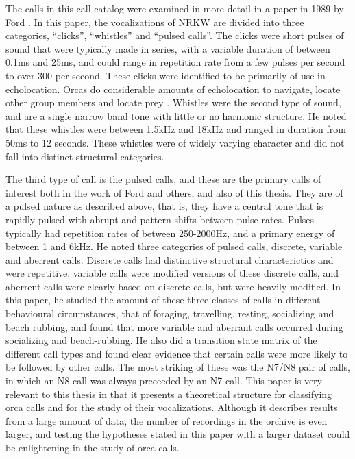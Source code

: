 \documentclass[12pt,oneside]{book}
\begin{document}
The calls in this call catalog were examined in more detail in a paper
in 1989 by Ford \cite{ford89}.  In this paper, the vocalizations of
NRKW are divided into three categories, ``clicks'', ``whistles'' and
``pulsed calls''.  The clicks were short pulses of sound that were
typically made in series, with a variable duration of between 0.1ms
and 25ms, and could range in repetition rate from a few pulses per
second to over 300 per second.  These clicks were identified to be
primarily of use in echolocation.  Orcas do considerable amounts of
echolocation to navigate, locate other group members and locate prey
\cite{barretlennard96}.  Whistles were the second type of sound, and
are a single narrow band tone with little or no harmonic structure.
He noted that these whistles were between 1.5kHz and 18kHz and ranged
in duration from 50ms to 12 seconds.  These whistles were of widely
varying character and did not fall into distinct structural
categories.

The third type of call is the pulsed calls, and these are the primary
calls of interest both in the work of Ford and others, and also of
this thesis.  They are of a pulsed nature as described above, that is,
they have a central tone that is rapidly pulsed with abrupt and
pattern shifts between pulse rates.  Pulses typically had repetition
rates of between 250-2000Hz, and a primary energy of between 1 and
6kHz.  He noted three categories of pulsed calls, discrete, variable
and aberrent calls.  Discrete calls had distinctive structural
characterictics and were repetitive, variable calls were modified
versions of these discrete calls, and aberrent calls were clearly
based on discrete calls, but were heavily modified.  In this paper, he
studied the amount of these three classes of calls in different
behavioural circumstances, that of foraging, travelling, resting,
socializing and beach rubbing, and found that more variable and
aberrant calls occurred during socializing and beach-rubbing.  He also
did a transition state matrix of the different call types and found
clear evidence that certain calls were more likely to be followed by
other calls.  The most striking of these was the N7/N8 pair of calls,
in which an N8 call was always preceeded by an N7 call.  This paper is
very relevant to this thesis in that it presents a theoretical
structure for classifying orca calls and for the study of their
vocalizations.  Although it describes results from a large amount of
data, the number of recordings in the orchive is even larger, and
testing the hypotheses stated in this paper with a larger dataset
could be enlightening in the study of orca calls.
\end{document}

